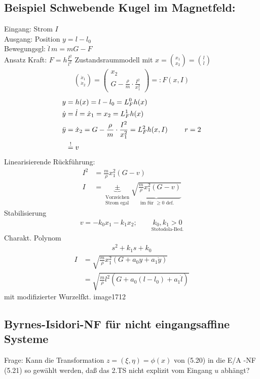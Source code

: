 \documentclass[ngerman]{tudscrreprt}
\begin{document}
\subsection*{Beispiel Schwebende Kugel im Magnetfeld:}
Eingang: Strom $I$\\ 
Ausgang: Position $y= l - l_0$\\ 
Bewegungsgl: $\ddot l\, m = mG - F$\\ 
Ansatz Kraft: $F = h \frac{I^2}{l^2}$
Zustandsraummodell mit $x = \binom{x_1}{x_2} = \binom{l}{\dot l}$
\begin{align*}
\binom{\dot x_1}{\dot x_2} = \begin{pmatrix}
x_2\\ 
G - \frac{\rho }{m} \cdot \frac{I^2}{x_1^2}
\end{pmatrix} =: F(x, I)
\end{align*}
\begin{align*}
y&= h(x)= l- l_0 = L_F^0 h(x)\\ 
\dot y&= \dot l = \dot x_1 = x_2 = L_F^1 h(x)\\ 
\ddot y&= \dot x_2 = G - \frac{\rho}{m}\cdot \frac{I^2}{x_1^2} = L_F^2 h(x, I) \qquad \textbf{ $ r=2$}\\ 
& \overset{!}{=} v
\end{align*}
Linearisierende Rückführung:
\begin{align*}
I^2 &= \frac{m}{\rho} x_1^2 (G - v)\\ 
I&= \underbrace{\pm}_{\substack{\text{Vorzeichen}\\ \text{Strom egal}}} \underbrace{\sqrt{\frac{m}{\rho} x_1^2 (G- v)}}_{ \text{ im für } \ge 0 \text{ def.} }
\end{align*}
Stabilisierung 
\begin{align*}
v = -k_0 x_1 - k_1 x_2 ; \qquad \underset{\text{Stotodola-Bed.}}{k_0, k_1 > 0}
\end{align*}
Charakt. Polynom
\begin{align*}
s^2 + k_1s + k_0
\end{align*}
\begin{align*}
I &= \sqrt{\frac{m}{\rho} x_1^2 (G + a_0 y + a_1 \dot y)}\\ 
&=\sqrt{\frac{m}{\rho} l^2 (G + a_0 (l- l_0) + a_1 \dot l)}
\end{align*}
mit modifizierter Wurzelfkt.
image1712
\subsection{Byrnes-Isidori-NF für nicht eingangsaffine Systeme}
Frage: Kann die Transformation $z = (\xi, \eta) = \phi(x)$ von (5.20) in die E/A -NF (5.21) so gewählt werden, daß das 2.TS nicht explizit vom Eingang $u$ abhängt?
\end{document}
